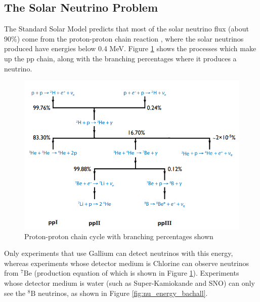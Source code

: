 \subsection{The Solar Neutrino Problem}

The Standard Solar Model predicts that most of the solar neutrino flux (about 90\%) come from the proton-proton chain reaction \cite{borexino2018comprehensive}, where the solar neutrinos produced have energies below 0.4 MeV. Figure \ref{fig:ppchain} shows the processes which make up the pp chain, along with the branching percentages where it produces a neutrino. 

\begin{figure}
    \includegraphics[width=\textwidth]{Figures/ppchain.png}
    \caption{Proton-proton chain cycle with branching percentages shown}
    \label{fig:ppchain}
\end{figure}

Only experiments that use Gallium can detect neutrinos with this energy, whereas experiments whose detector medium is Chlorine can observe neutrinos from ${ }^{7} \mathrm{Be}$ (production equation of which is shown in Figure \ref{fig:ppchain}). Experiments whose detector medium is water (such as Super-Kamiokande and SNO) can only see the ${ }^{8} \mathrm{B}$ neutrinos, as shown in Figure \ref{fig:nu_energy_bachall}.


